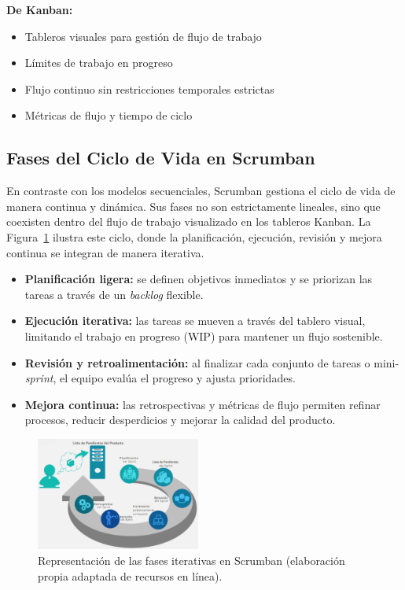 \documentclass[conference]{IEEEtran}
\begin{document}
\textbf{De Kanban:}
\begin{itemize}
\item Tableros visuales para gestión de flujo de trabajo
\item Límites de trabajo en progreso
\item Flujo continuo sin restricciones temporales estrictas
\item Métricas de flujo y tiempo de ciclo \cite{kanban_vs_scrum}
\end{itemize}

\subsection{Fases del Ciclo de Vida en Scrumban}

En contraste con los modelos secuenciales, Scrumban gestiona el ciclo de vida de manera continua y dinámica. Sus fases no son estrictamente lineales, sino que coexisten dentro del flujo de trabajo visualizado en los tableros Kanban. La Figura~\ref{fig:scrumban} ilustra este ciclo, donde la planificación, ejecución, revisión y mejora continua se integran de manera iterativa.

\begin{itemize}
    \item \textbf{Planificación ligera:} se definen objetivos inmediatos y se priorizan las tareas a través de un \textit{backlog} flexible.
    \item \textbf{Ejecución iterativa:} las tareas se mueven a través del tablero visual, limitando el trabajo en progreso (WIP) para mantener un flujo sostenible.
    \item \textbf{Revisión y retroalimentación:} al finalizar cada conjunto de tareas o mini-\textit{sprint}, el equipo evalúa el progreso y ajusta prioridades.
    \item \textbf{Mejora continua:} las retrospectivas y métricas de flujo permiten refinar procesos, reducir desperdicios y mejorar la calidad del producto.
\end{itemize}

\begin{figure}[h]
    \centering
    \includegraphics[width=0.48\textwidth]{scrumban.png}
    \caption{Representación de las fases iterativas en Scrumban (elaboración propia adaptada de recursos en línea).}
    \label{fig:scrumban}
\end{figure}
\end{document}
